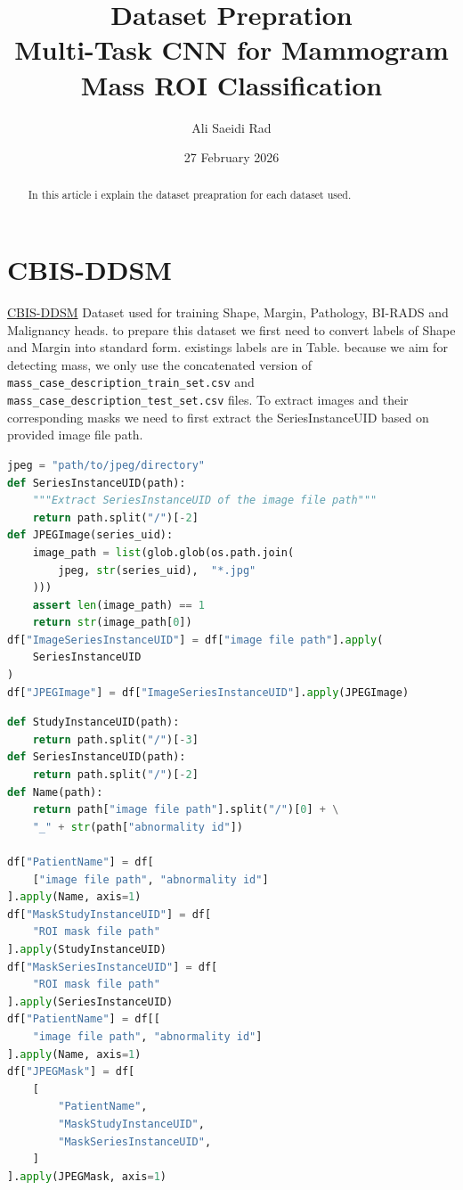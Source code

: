 \documentclass[11pt,a4paper]{article}
\title{\textbf{Dataset Prepration}\\
Multi-Task CNN for Mammogram Mass ROI Classification}
\author{Ali Saeidi Rad}
\date{27 February 2026}
\begin{document}
\maketitle

\begin{abstract}
    In this article i explain the dataset preapration for each dataset used.
\end{abstract}

\section{CBIS-DDSM}
\href{https://www.kaggle.com/datasets/awsaf49/cbis-ddsm-breast-cancer-image-dataset}{CBIS-DDSM} Dataset used for training Shape, Margin, Pathology, BI-RADS and Malignancy heads.
to prepare this dataset we first need to convert labels of Shape and Margin into standard form. existings labels are in Table.
because we aim for detecting mass, we only use the concatenated version of \texttt{mass\_case\_description\_train\_set.csv} and  \texttt{mass\_case\_description\_test\_set.csv} files.
To extract images and their corresponding masks we need to first extract the SeriesInstanceUID based on provided image file path.


\begin{lstlisting}[language=Python, caption=Extracting image file path]
jpeg = "path/to/jpeg/directory"
def SeriesInstanceUID(path):
    """Extract SeriesInstanceUID of the image file path"""
    return path.split("/")[-2]
def JPEGImage(series_uid):
    image_path = list(glob.glob(os.path.join(
        jpeg, str(series_uid),  "*.jpg"
    )))
    assert len(image_path) == 1
    return str(image_path[0])
df["ImageSeriesInstanceUID"] = df["image file path"].apply(
    SeriesInstanceUID
)
df["JPEGImage"] = df["ImageSeriesInstanceUID"].apply(JPEGImage)
\end{lstlisting}

\begin{lstlisting}[language=Python, caption=Extracting mask file path]
def StudyInstanceUID(path):
    return path.split("/")[-3]
def SeriesInstanceUID(path):
    return path.split("/")[-2]
def Name(path):
    return path["image file path"].split("/")[0] + \
    "_" + str(path["abnormality id"])

df["PatientName"] = df[
    ["image file path", "abnormality id"]
].apply(Name, axis=1)
df["MaskStudyInstanceUID"] = df[
    "ROI mask file path"
].apply(StudyInstanceUID)
df["MaskSeriesInstanceUID"] = df[
    "ROI mask file path"
].apply(SeriesInstanceUID)
df["PatientName"] = df[[
    "image file path", "abnormality id"]
].apply(Name, axis=1)
df["JPEGMask"] = df[
    [
        "PatientName",
        "MaskStudyInstanceUID",
        "MaskSeriesInstanceUID",
    ]
].apply(JPEGMask, axis=1)
\end{lstlisting}
\end{document}
